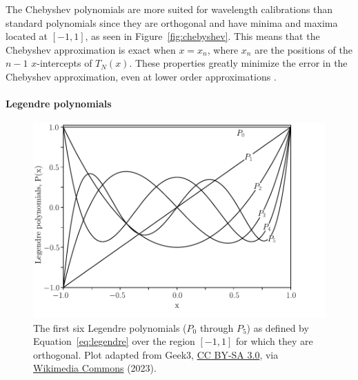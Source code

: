 

The Chebyshev polynomials are more suited for wavelength calibrations than standard polynomials since they are orthogonal and have minima and maxima located at $[-1, 1]$, as seen in Figure~\ref{fig:chebyshev}. This means that the Chebyshev approximation is exact when $x = x_{n}$, where $x_{n}$ are the positions of the $n - 1$ $x$-intercepts of $T_{N}(x)$. These properties greatly minimize the error in the Chebyshev approximation, even at lower order approximations \citep{cheby}.


\paragraph{Legendre polynomials}

\begin{figure}[t]
    \centering
    \includegraphics[width = 12cm]{figures/2_legendre.pdf}
    \caption{The first six Legendre polynomials ($P_0$ through $P_{5}$) as defined by Equation~\ref{eq:legendre} over the region $[-1, 1]$ for which they are orthogonal. Plot adapted from Geek3, \protect\href{https://creativecommons.org/licenses/by-sa/3.0}{CC BY-SA 3.0}, via \protect\href{https://commons.wikimedia.org/wiki/File:Legendrepolynomials6.svg}{Wikimedia Commons} (2023).}
    \label{fig:legendre}
\end{figure}

